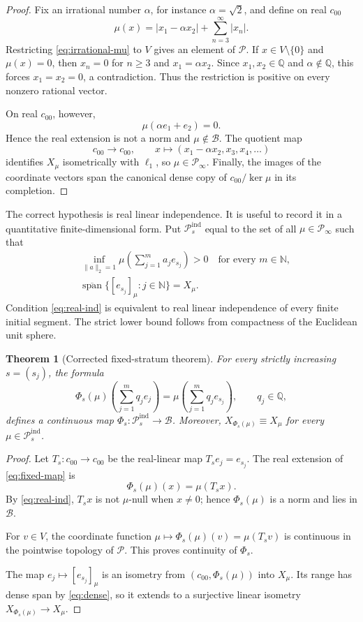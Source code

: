 \documentclass[11pt]{article}
\newtheorem{theorem}{Theorem}[section]
\theoremstyle{definition}
\newcommand{\Pcal}{\mathcal P}
\newcommand{\Bcal}{\mathcal B}
\newcommand{\N}{\mathbb N}
\newcommand{\Q}{\mathbb Q}
\newcommand{\clspan}{\overline{\operatorname{span}}}
\newcommand{\equiviso}{\equiv}
\begin{document}
\begin{proof}
Fix an irrational number $\alpha$, for instance $\alpha=\sqrt2$, and define on
real $c_{00}$
\[
 \mu(x)=|x_1-\alpha x_2|+\sum_{n=3}^{\infty}|x_n|.
 \tag{2.2}\label{eq:irrational-mu}
\]
Restricting \eqref{eq:irrational-mu} to $V$ gives an element of $\Pcal$.  If
$x\in V\setminus\{0\}$ and $\mu(x)=0$, then $x_n=0$ for $n\geq3$ and
$x_1=\alpha x_2$.  Since $x_1,x_2\in\Q$ and $\alpha\notin\Q$, this forces
$x_1=x_2=0$, a contradiction.  Thus the restriction is positive on every
nonzero rational vector.

On real $c_{00}$, however,
\[
 \mu(\alpha e_1+e_2)=0.
\]
Hence the real extension is not a norm and $\mu\notin\Bcal$.  The quotient map
\[
 c_{00}\longrightarrow c_{00},\qquad
 x\longmapsto (x_1-\alpha x_2,x_3,x_4,\ldots)
\]
identifies $X_\mu$ isometrically with $\ell_1$, so $\mu\in\Pcal_\infty$.
Finally, the images of the coordinate vectors span the canonical dense copy of
$c_{00}/\ker\mu$ in its completion.
\end{proof}

The correct hypothesis is real linear independence.  It is useful to record it
in a quantitative finite-dimensional form.  Put $\Pcal_s^{\mathrm{ind}}$ equal
to the set of all $\mu\in\Pcal_\infty$ such that
\begin{align}
 &\inf_{\|a\|_2=1}
   \mu\left(\sum_{j=1}^m a_je_{s_j}\right)>0
   \quad\text{for every }m\in\N,                                    
   \tag{2.3}\label{eq:real-ind}\\
 &\clspan\{[e_{s_j}]_\mu:j\in\N\}=X_\mu.                           
   \tag{2.4}\label{eq:dense}
\end{align}
Condition \eqref{eq:real-ind} is equivalent to real linear independence of every
finite initial segment.  The strict lower bound follows from compactness of the
Euclidean unit sphere.

\begin{theorem}[Corrected fixed-stratum theorem]\label{thm:fixed}
For every strictly increasing $s=(s_j)$, the formula
\[
 \Phi_s(\mu)\left(\sum_{j=1}^m q_je_j\right)
 =\mu\left(\sum_{j=1}^m q_je_{s_j}\right),\qquad q_j\in\Q,
 \tag{2.5}\label{eq:fixed-map}
\]
defines a continuous map
$\Phi_s:\Pcal_s^{\mathrm{ind}}\to\Bcal$.  Moreover,
$X_{\Phi_s(\mu)}\equiviso X_\mu$ for every
$\mu\in\Pcal_s^{\mathrm{ind}}$.
\end{theorem}

\begin{proof}
Let $T_s:c_{00}\to c_{00}$ be the real-linear map $T_se_j=e_{s_j}$.
The real extension of \eqref{eq:fixed-map} is
\[
 \Phi_s(\mu)(x)=\mu(T_sx).
\]
By \eqref{eq:real-ind}, $T_sx$ is not $\mu$-null when $x\neq0$; hence
$\Phi_s(\mu)$ is a norm and lies in $\Bcal$.

For $v\in V$, the coordinate function
$\mu\mapsto\Phi_s(\mu)(v)=\mu(T_sv)$ is continuous in the pointwise topology of
$\Pcal$.  This proves continuity of $\Phi_s$.

The map $e_j\mapsto[e_{s_j}]_\mu$ is an isometry from
$(c_{00},\Phi_s(\mu))$ into $X_\mu$.  Its range has dense span by
\eqref{eq:dense}, so it extends to a surjective linear isometry
$X_{\Phi_s(\mu)}\to X_\mu$.
\end{proof}
\end{document}
